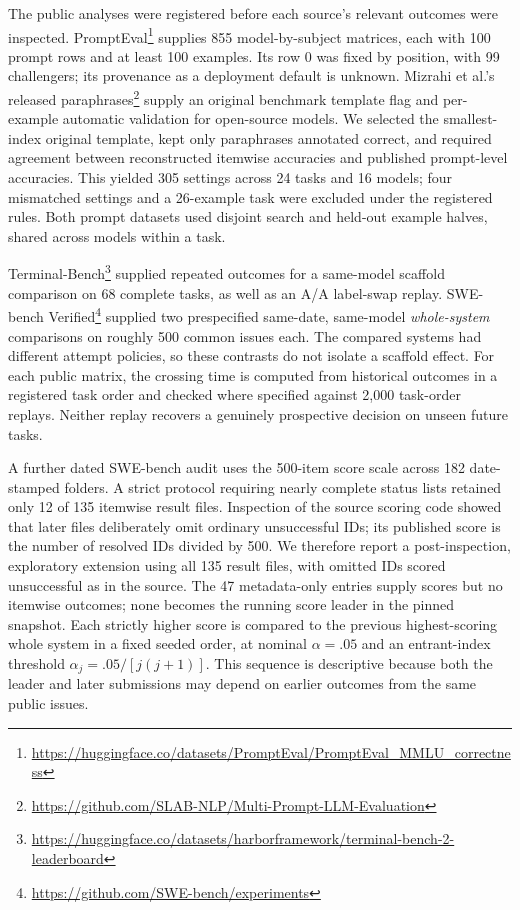 \documentclass[11pt]{article}
\begin{document}
The public analyses were registered before each source's relevant outcomes were inspected. PromptEval\footnote{\url{https://huggingface.co/datasets/PromptEval/PromptEval_MMLU_correctness}} supplies 855 model-by-subject matrices, each with 100 prompt rows and at least 100 examples. Its row 0 was fixed by position, with 99 challengers; its provenance as a deployment default is unknown. Mizrahi et al.'s released paraphrases\footnote{\url{https://github.com/SLAB-NLP/Multi-Prompt-LLM-Evaluation}} supply an original benchmark template flag and per-example automatic validation for open-source models. We selected the smallest-index original template, kept only paraphrases annotated correct, and required agreement between reconstructed itemwise accuracies and published prompt-level accuracies. This yielded 305 settings across 24 tasks and 16 models; four mismatched settings and a 26-example task were excluded under the registered rules. Both prompt datasets used disjoint search and held-out example halves, shared across models within a task.

Terminal-Bench\footnote{\url{https://huggingface.co/datasets/harborframework/terminal-bench-2-leaderboard}} supplied repeated outcomes for a same-model scaffold comparison on 68 complete tasks, as well as an A/A label-swap replay. SWE-bench Verified\footnote{\url{https://github.com/SWE-bench/experiments}} supplied two prespecified same-date, same-model \emph{whole-system} comparisons on roughly 500 common issues each. The compared systems had different attempt policies, so these contrasts do not isolate a scaffold effect. For each public matrix, the crossing time is computed from historical outcomes in a registered task order and checked where specified against 2,000 task-order replays. Neither replay recovers a genuinely prospective decision on unseen future tasks.

A further dated SWE-bench audit uses the 500-item score scale across 182 date-stamped folders. A strict protocol requiring nearly complete status lists retained only 12 of 135 itemwise result files. Inspection of the source scoring code showed that later files deliberately omit ordinary unsuccessful IDs; its published score is the number of resolved IDs divided by 500. We therefore report a post-inspection, exploratory extension using all 135 result files, with omitted IDs scored unsuccessful as in the source. The 47 metadata-only entries supply scores but no itemwise outcomes; none becomes the running score leader in the pinned snapshot. Each strictly higher score is compared to the previous highest-scoring whole system in a fixed seeded order, at nominal $\alpha=.05$ and an entrant-index threshold $\alpha_j=.05/[j(j+1)]$. This sequence is descriptive because both the leader and later submissions may depend on earlier outcomes from the same public issues.
\end{document}
